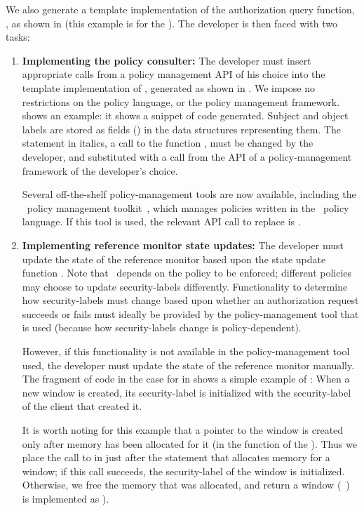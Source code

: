 We also generate a template implementation of the authorization query function,
, as shown in  (this example is
for the \xserver). The developer is then faced with two tasks:

\begin{enumerate}
%
\item \textbf{Implementing the policy consulter:} The developer must insert
appropriate calls from a policy management API of his choice into the template
implementation of , generated as shown in
. We impose no restrictions on the policy language,
or the policy management framework.   shows an
example: it shows a snippet of code generated. Subject and object labels are
stored as fields () in the data structures representing them.  The
statement in italics, a call to the function , must be
changed by the developer, and substituted with a call from the API of a
policy-management framework of the developer's choice. 

Several off-the-shelf policy-management tools are now available, including the
\selinux\ policy management toolkit~\cite{tresys1}, which manages policies
written in the \selinux\ policy language. If this tool is used, the relevant
API call to replace  is .


\item \textbf{Implementing reference monitor state updates:} The developer must
update the state of the reference monitor based upon the state update function
\update. Note that \update\ depends on the policy to be enforced; different
policies may choose to update security-labels differently. Functionality to
determine how security-labels must change based upon whether an authorization
request succeeds or fails must ideally be provided by the policy-management
tool that is used (because how security-labels change is policy-dependent).

However, if this functionality is not available in the policy-management tool
used, the developer must update the state of the reference monitor manually.
The fragment of code in the case for  in
 shows a simple example of \update: When a new
window is created, its security-label is initialized with the security-label of
the client that created it. 

It is worth noting for this example that a pointer to the window is created
only after memory has been allocated for it (in the 
function of the \xserver). Thus we place the call to  in
 just after the statement that allocates memory for a
window; if this call succeeds, the security-label of the window is initialized.
Otherwise, we free the memory that was allocated, and return a 
window (\ie\ ) is implemented as ).

\end{enumerate}

